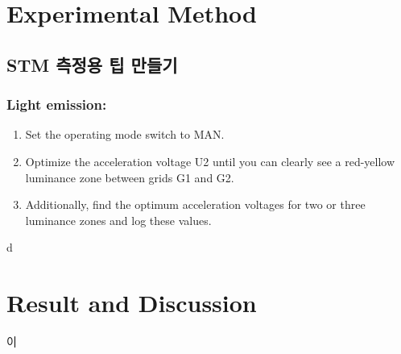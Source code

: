 \documentclass[a4paper, 10pt, nanum]{CSUniSchoolLabReport}
\begin{document}
\section{Experimental Method}

\subsection{STM 측정용 팁 만들기}


	
	\subsubsection{Light emission:}
	\begin{enumerate}[label=\arabic*.]
		\item Set the operating mode switch to MAN. 
		\item Optimize the acceleration voltage U2 until you can clearly see a red-yellow luminance zone between grids G1 and G2. 
		\item Additionally, find the optimum acceleration voltages for two or three luminance zones and log these values. 
	\end{enumerate}


d


\section{Result and Discussion}

	이

	\begin{table}[htb!]
		\label{tab:2}
		\centering
		\caption{전하의 흐름이 상승(peak)하는 부분이다.}
	\end{table}
\end{document}
